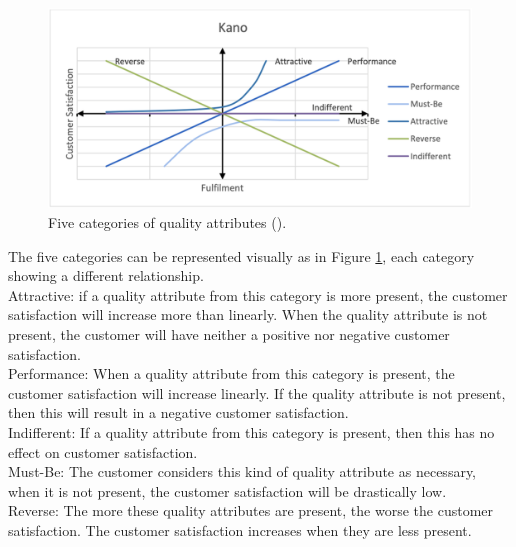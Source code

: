 \begin{figure}[ht]
	\includegraphics[scale=0.35]{Thesis/LaTeX/Figures/KANO.png}
	\caption{Five categories of quality attributes (\cite{KANO1984}).}
	\label{fig:kano}
\end{figure}
\break
The five categories can be represented visually as in Figure \ref{fig:kano}, each category showing a different relationship.\\
\break
Attractive: if a quality attribute from this category is more present, the customer satisfaction will increase more than linearly. When the quality attribute is not present, the customer will have neither a positive nor negative customer satisfaction.\\
\break
Performance: When a quality attribute from this category is present, the customer satisfaction will increase linearly. If the quality attribute is not present, then this will result in a negative customer satisfaction.\\
\break
Indifferent: If a quality attribute from this category is present, then this has no effect on customer satisfaction.\\
\break
Must-Be: The customer considers this kind of quality attribute as necessary, when it is not present, the customer satisfaction will be drastically low.\\
\break
Reverse: The more these quality attributes are present, the worse the customer satisfaction. The customer satisfaction increases when they are less present.\\

